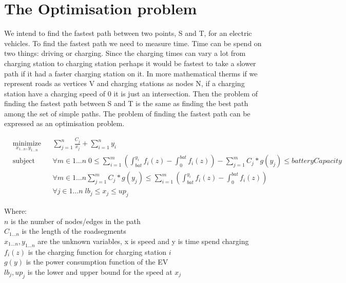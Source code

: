 \section{The Optimisation problem}

We intend to find the fastest path between two points, S and T, for an electric vehicles. To find the fastest path we need to measure time. Time can be spend on two things: driving or charging. Since the charging times can vary a lot from charging station to charging station perhaps it would be fastest to take a slower path if it had a faster charging station on it. In more mathematical therms if we represent roads as vertices V and charging stations as nodes N, if a charging station have a charging speed of 0 it is just an intersection. Then the problem of finding the fastest path between S and T is the same as finding the best path among the set of simple paths. The problem of finding the  fastest path can be expressed as an optimisation problem.

\begin{equation}
\begin{aligned}
& \underset{x_{1 \dots n},y_{1 \dots n}}{\text{minimize}} & & \sum_{j=1}^{n} \frac{C_j}{x_j} + \sum_{i=1}^{n} y_i \\
& \text{subject to} 
& & \forall{m \in 1 \dots n} \; 0 \leq \sum_{i=1}^{m} \left( \int_{bat}^{y_i} f_i(z) - \int_{0}^{bat} f_i(z)\right) - \sum_{j=1}^{m} C_j*g(y_j) \leq batteryCapacity \\
&&& \forall{m \in 1 \dots n} \sum_{j=1}^{m} C_j*g(y_j) \leq \sum_{i=1}^{m} \left( \int_{bat}^{y_i} f_i(z) - \int_{0}^{bat} f_i(z)\right) \\
&&& \forall{j \in 1 \dots n} \; lb_j \leq x_j \leq up_j
\end{aligned}
\end{equation}\label{eq:optipro}

Where: \\
$n$ is the number of nodes/edges in the path \\
$C_{1 \dots n}$ is the length of the roadsegments \\
$x_{1 \dots n}, y_{1 \dots n}$ are the unknown variables, x is speed and y is time spend charging \\
$f_{i}(z)$ is the charging function for charging station $i$ \\
$g(y)$ is the power consumption function of the EV \\
$lb_j, up_j$ is the lower and upper bound for the speed at $x_j$  \\

